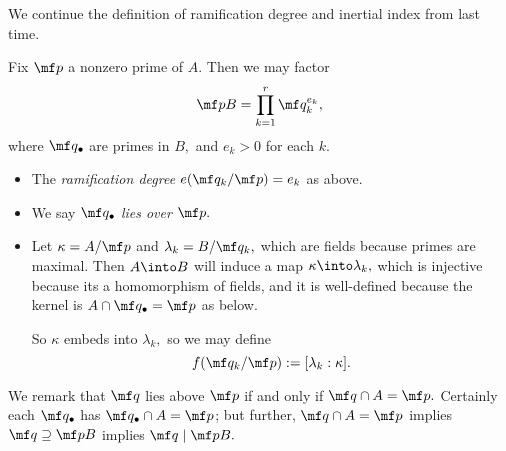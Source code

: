 \documentclass[../notes.tex]{subfiles}
\begin{document}
We continue the definition of ramification degree and inertial index from last time.
\begin{defi} \label{def:raminert}
	Fix $\mf p$ a nonzero prime of $A.$ Then we may factor
	\[\mf pB=\prod_{k=1}^r\mf q_k^{e_k},\]
	where $\mf q_\bullet$ are primes in $B,$ and $e_k>0$ for each $k.$
	\begin{itemize}
		\item The \textit{ramification degree}  $e(\mf q_k/\mf p)=e_k$ as above.
		\item We say $\mf q_\bullet$ \textit{lies over} $\mf p.$
		\item Let $\kappa=A/\mf p$ and $\lambda_k=B/\mf q_k,$ which are fields because primes are maximal. Then $A\into B$ will induce a map $\kappa\into\lambda_k,$ which is injective because its a homomorphism of fields, and it is well-defined because the kernel is $A\cap\mf q_\bullet=\mf p$ as below.
		
		So $\kappa$ embeds into $\lambda_k,$ so we may define
		\[f(\mf q_k/\mf p):=[\lambda_k:\kappa].\]
	\end{itemize}
\end{defi}
We remark that $\mf q$ lies above $\mf p$ if and only if $\mf q\cap A=\mf p.$ Certainly each $\mf q_\bullet$ has $\mf q_\bullet\cap A=\mf p$\todo{}; but further, $\mf q\cap A=\mf p$ implies $\mf q\supseteq\mf pB$ implies $\mf q\mid\mf pB.$
\end{document}
